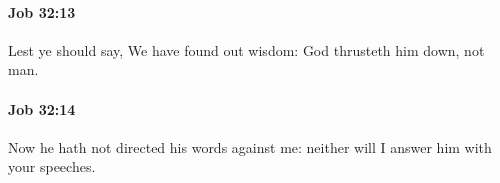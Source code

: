 		\paragraph{Job 32:13} %
			\label{JOB-32-13}

			Lest ye should say, We have found out wisdom: God thrusteth him down, not man.


		\paragraph{Job 32:14} %
			\label{JOB-32-14}

			Now he hath not directed his words against me: neither will I answer him with your speeches.


